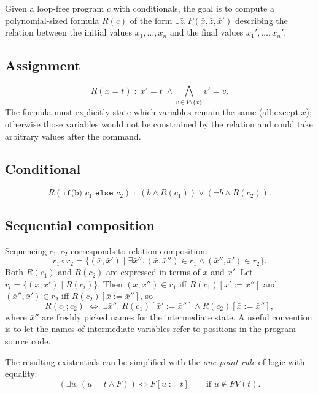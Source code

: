 Given a loop-free program $c$ with conditionals, the goal is to compute a polynomial-sized formula $R(c)$ of the form $\exists \bar z.\, F(\bar x, \bar z, \bar x')$ describing the relation between the initial values $x_1, \ldots, x_n$ and the final values $x_1', \ldots, x_n'$.
 
 
\subsection*{Assignment}
\[
R(x = t) \;:\; x' = t \;\wedge \bigwedge_{v \in V \setminus \{x\}} v' = v.
\]
The formula must explicitly state which variables remain the same (all except $x$); otherwise those variables would not be constrained by the relation and could take arbitrary values after the command.
 
\subsection*{Conditional}
\[
R(\texttt{if(b) } c_1 \texttt{ else } c_2) \;:\; (b \wedge R(c_1)) \vee (\neg b \wedge R(c_2)).
\]
 
\subsection*{Sequential composition}
 
Sequencing $c_1; c_2$ corresponds to relation composition:
\[
r_1 \circ r_2 = \{(\bar x, \bar x') \mid \exists \bar x''.\, (\bar x, \bar x'') \in r_1 \wedge (\bar x'', \bar x') \in r_2\}.
\]
Both $R(c_1)$ and $R(c_2)$ are expressed in terms of $\bar x$ and $\bar x'$. Let $r_i = \{(\bar x, \bar x') \mid R(c_i)\}$. Then $(\bar x, \bar x'') \in r_1$ iff $R(c_1)[\bar x' := \bar x'']$ and $(\bar x'', \bar x') \in r_2$ iff $R(c_2)[\bar x := \bar x'']$, so
\[
R(c_1; c_2) \;\iff\; \exists \bar x''.\; R(c_1)[\bar x' := \bar x''] \wedge R(c_2)[\bar x := \bar x''],
\]
where $\bar x''$ are freshly picked names for the intermediate state. A useful convention is to let the names of intermediate variables refer to positions in the program source code.
 
The resulting existentials can be simplified with the \emph{one-point rule} of logic with equality:
\[
(\exists u.\, (u = t \wedge F)) \iff F[u := t] \qquad \text{if } u \notin FV(t).
\]
 
